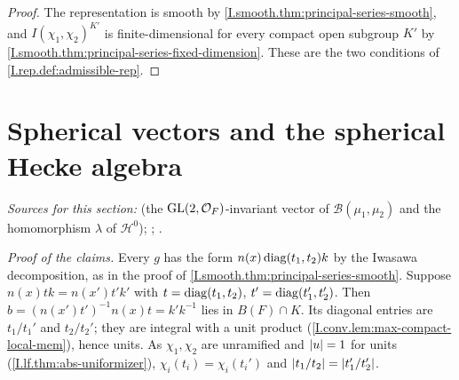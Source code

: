 \begin{corollary}[admissibility]
\end{corollary}
\begin{proof}
The representation is smooth by \cref{I.smooth.thm:principal-series-smooth}, and $I(\chi_1,\chi_2)^{K'}$ is
finite-dimensional for every compact open subgroup $K'$ by \cref{I.smooth.thm:principal-series-fixed-dimension}.
These are the two conditions of \cref{I.rep.def:admissible-rep}.
\end{proof}

\section{Spherical vectors and the spherical Hecke algebra}\label{sec:smooth-spherical}

{\sloppy\noindent\emph{Sources for this section:} \cite[Lemma~3.9 and the paragraph after it, p.~59]{JL} (the
$\mathrm{GL}(2,\mathcal{O}_F)$-invariant vector of $\mathcal B(\mu_1,\mu_2)$ and the homomorphism $\lambda$ of $\mathcal H^0$);
\cite[§9.1, $\varphi_K$]{Cas-p}; \cite[§2.2, Hecke algebras, p.~23]{Cas-p}.\par}

\begin{definition}
\end{definition}

\noindent\emph{Proof of the claims.} Every $g$ has the form $n(x)\operatorname{diag}(t_1,t_2)k$ by the Iwasawa decomposition, as in
the proof of \cref{I.smooth.thm:principal-series-smooth}. Suppose $n(x)tk=n(x')t'k'$ with $t=\operatorname{diag}(t_1,t_2)$,
$t'=\operatorname{diag}(t_1',t_2')$. Then $b=(n(x')t')^{-1}n(x)t=k'k^{-1}$ lies in $B(F)\cap K$. Its diagonal entries are $t_1/t_1'$
and $t_2/t_2'$; they are integral with a unit product (\cref{I.conv.lem:max-compact-local-mem}), hence units. As
$\chi_1,\chi_2$ are unramified and $\lvert u\rvert=1$ for units (\cref{I.lf.thm:abs-uniformizer}), $\chi_i(t_i)=\chi_i(t_i')$
and $\lvert t_1/t_2\rvert=\lvert t_1'/t_2'\rvert$.

